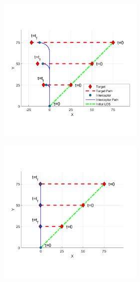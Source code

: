 \documentclass[conference]{IEEEtran}
\begin{document}
\begin{figure}[H]
	\centering
	\includegraphics[width=7cm]{rinit08.png}
	\caption{}
	\label{}
\end{figure}

\begin{figure}[H]
	\centering
	\includegraphics[width=7cm]{rinit07.png}
	\caption{}
	\label{}
\end{figure}



\end{document}
